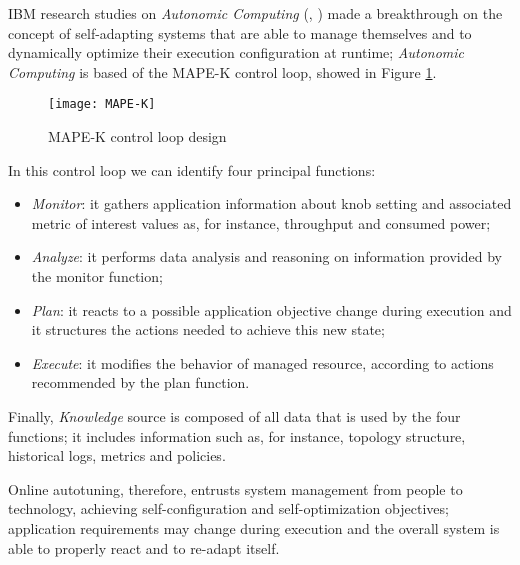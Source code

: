 IBM research studies on \textit{Autonomic Computing} (\cite{kephart2003vision}, \cite{computing2006architectural}) made a breakthrough on the concept of self-adapting systems that are able to manage themselves and to dynamically optimize their execution configuration at runtime; \textit{Autonomic Computing} is based of the MAPE-K control loop, showed in Figure \ref{fig::mape-k}.

\begin{figure}[htb]

    \centering
    \texttt{[image: MAPE-K]}
    \caption{MAPE-K control loop design}
    \label{fig::mape-k}

\end{figure}

In this control loop we can identify four principal functions:

\begin{itemize}

    \item \textit{Monitor}: it gathers application information about knob setting and associated metric of interest values as, for instance, throughput and consumed power;
    
    \item \textit{Analyze}: it performs data analysis and reasoning on information provided by the monitor function;
    
    \item \textit{Plan}: it reacts to a possible application objective change during execution and it structures the actions needed to achieve this new state;
    
    \item \textit{Execute}: it modifies the behavior of managed resource, according to actions recommended by the plan function.

\end{itemize}

Finally, \textit{Knowledge} source is composed of all data that is used by the four functions; it includes information such as, for instance, topology structure, historical logs, metrics and policies.

Online autotuning, therefore, entrusts system management from people to technology, achieving self-configuration and self-op\-ti\-mi\-za\-tion objectives; application requirements may change during execution and the overall system is able to properly react and to re-adapt itself.





